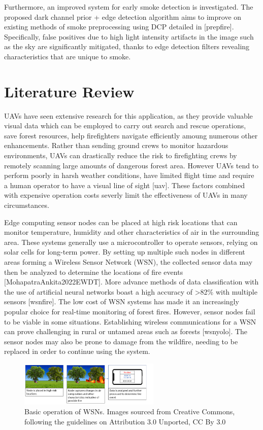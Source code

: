 Furthermore, an improved system for early smoke detection is
investigated. The proposed dark channel prior + edge detection algorithm
aims to improve on existing methods of smoke preprocessing using DCP
detailed in {[}prepfire{]}. Specifically, false positives due to high
light intensity artifacts in the image such as the sky are significantly
mitigated, thanks to edge detection filters revealing characteristics
that are unique to smoke.

\section{Literature Review}

UAVs have seen extensive research for this application, as they provide
valuable visual data which can be employed to carry out search and
rescue operations, save forest resources, help firefighters navigate
efficiently amoung numerous other enhancements. Rather than sending
ground crews to monitor hazardous environments, UAVs can drastically
reduce the risk to firefighting crews by remotely scanning large amounts
of dangerous forest area. However UAVs tend to perform poorly in harsh
weather conditions, have limited flight time and require a human
operator to have a visual line of sight {[}uav{]}. These factors
combined with expensive operation costs severly limit the effectiveness
of UAVs in many circumstances.

Edge computing sensor nodes can be placed at high risk locations that
can monitor temperature, humidity and other characteristics of air in
the surrounding area. These systems generally use a microcontroller to
operate sensors, relying on solar cells for long-term power. By setting
up multiple such nodes in different areas forming a Wireless Sensor
Network (WSN), the collected sensor data may then be analyzed to
determine the locations of fire events {[}MohapatraAnkita2022EWDT{]}.
More advance methods of data classification with the use of artificial
neural networks boast a high accuracy of \textgreater82\% with multiple
sensors {[}wsnfire{]}. The low cost of WSN systems has made it an
increasingly popular choice for real-time monitoring of forest fires.
However, sensor nodes fail to be viable in some situations. Establishing
wireless communications for a WSN can prove challenging in rural or
untamed areas such as forests {[}wsnyolo{]}. The sensor nodes may also
be prone to damage from the wildfire, needing to be replaced in order to
continue using the system.

\begin{figure}
\centering
\includegraphics[width=0.6\textwidth,height=\textheight]{sensornode.png}
\caption{Basic operation of WSNs. Images sourced from Creative Commons,
following the guidelines on Attribution 3.0 Unported, CC By 3.0}
\end{figure}

